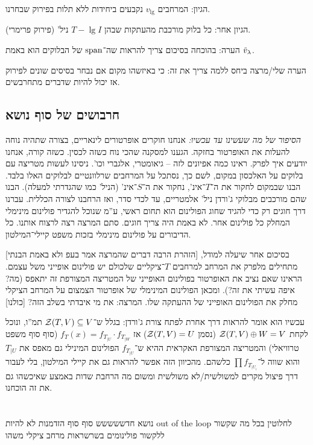 \documentclass[]{../../../../tex/classes/styledArticle}
\begin{document}
    הגיון: המרחבים $v_\lg$ נקבעים ביחידות ללא תלות בפירוק שבחרנו. 
    
    הגיון אחר: כל בלוק מורכבת מהעתקות שבהן $T - \lg I$ ניל' (פירוק פרימרי). 
    
    הערה: בהוכחה בסיכום צריך להראות שה־$\operatorname{span}$ של הבלוקים הוא באמת $\tilde v_\lambda$. 
    
    הערה שלי/מרצה ביחס ללמה צריך את זה: כי באיזשהו מקום אם נבחר בסיסים שונים לפירוק אז יכול להיות שדברים מתחרבשים. 
    
    \subsection{חרבושים של סוף נושא}
    
    \textit{הסיפור של מה שעשינו עד עכשיו: }אנחנו חוקרים אופרטורים לינאריים, בצורה שתהיה נוחה להעלות את האופרטור בחזקה. הגענו למסקנה שהכי נוח כשזה לכסין. כשזה קורה, אנחנו יודעים איך לפרק. ראינו כמה אפיונים לזה – גיאומטרי, אלגברי וכו'. ניסינו לעשות מטריצה עם בלוקים על האלכסון במקום, לשם כך, נסתכל על המרחבים שרלוונטיים לבלוקים האלו בלבד. הבנו שבמקום לחקור את ה־$T$־אינ', נחקור את ה־$S$־אינ' (הניל' כמו שהגדרתי למעלה). הבנו שהם מורכבים מבלוקי ג'ורדן ניל' אלמטריים, עד לכדי סדר, ואז הרחבנו לצורה הכללית. עברנו דרך חוגים רק כדי להגיד שחוג הפולינום הוא תחום ראשי, ע''מ שנוכל להגדיר פולינום מינימלי המחלק כל פולינום אחר. לא באמת היה צריך חוגים. סתם המרצה רצה לרצוח אותנו. כל הדיבורים על פולינום מינימלי בזכות משפט קיילי־המילטון. 
    
    בסיכום אחר שיעלה למודל, [הזהרת הרבה דברים שהמרצה אמר בעפ ולא באמת הבנתי] מתחילים מלפרק את המרחב למרחבים $T$־ציקליים שלכולם יש פולינום אופייני משל עצמם. הראינו שאם נציב את האופרטור בפולינום האופייני של המטריצה המצורפת זה יתאפס (מה? איפה עשיתי את זה?). ומכאן הפולינום המינימלי של אופרטור הצמצום על המרחב הציקלי מחלק את הפולינום האופייני של ההעתקה שלו. המרצה: את מי איבדתי בשלב הזה? [כולנו]
    
    עכשיו הוא אומר להראות דרך אחרת לפתח צורת ג'ורדן: בגלל ש־$\mathcal{Z}(T, V) \subseteq V$ תמ''ו, ונוכל לקחת $\mathcal{Z}(T, V) \oplus W = V$ (נסמן $\mathcal{Z}(T, V) = U$) אז $f_T(x) = f_{T_{|U}} \cdot f_{T_{|W}}$ (סוף סוף משפט טרוויאלי) והמטריצה המצורפת האקראית ההיא ש־$f_{T_{|U}}$ הפולינום המינילי גם מאפס את $T_{|U}$ 
    והוא שווה ל־$\prod f_{T_{|U_i}}$ כלשהם. מהכיוון הזה אפשר להראות גם את קיילי המילטון, בלי לעבור דרך פיצול מקרים למשולשית/לא משולשית ומשום מה הרחבת שדות באמצע שאיכשהו גם את זה הוכחנו. 
    
    \section{}
    נושא חדששששש סוף סוף הזדמנות לא להיות out of the loop לחלוטין בכל מה שקשור ללקשור פולינומים בשרשראות מרחב ציקלי משהו
    
\end{document}
